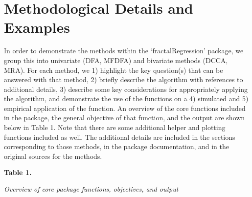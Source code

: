 \documentclass[
  man]{apa6}
\begin{document}
\hypertarget{methodological-details-and-examples}{%
\section{Methodological Details and Examples}\label{methodological-details-and-examples}}

In order to demonstrate the methods within the `fractalRegression'
package, we group this into univariate (DFA, MFDFA) and bivariate
methods (DCCA, MRA). For each method, we 1) highlight the key
question(s) that can be answered with that method, 2) briefly describe
the algorithm with references to additional details, 3) describe some
key considerations for appropriately applying the algorithm, and
demonstrate the use of the functions on a 4) simulated and 5) empirical
application of the function. An overview of the core functions included
in the package, the general objective of that function, and the output
are shown below in Table 1. Note that there are some additional helper
and plotting functions included as well. The additional details are
included in the sections corresponding to those methods, in the package
documentation, and in the original sources for the methods.

\textbf{Table 1.}

\emph{Overview of core package functions, objectives, and output}
\end{document}

